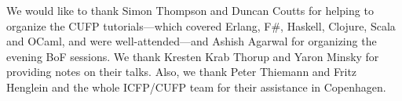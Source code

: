 \documentclass{jfp1}
\begin{document}
We would like to thank Simon Thompson and Duncan Coutts for helping to
organize the CUFP tutorials---which covered Erlang, F\#, Haskell, Clojure, Scala and OCaml, and were well-attended---and Ashish Agarwal for organizing the evening BoF
sessions.  We thank Kresten Krab Thorup and Yaron Minsky for providing
notes on their talks.  Also, we thank Peter Thiemann and Fritz Henglein and the
whole ICFP/CUFP team for their assistance in Copenhagen.


\end{document}

